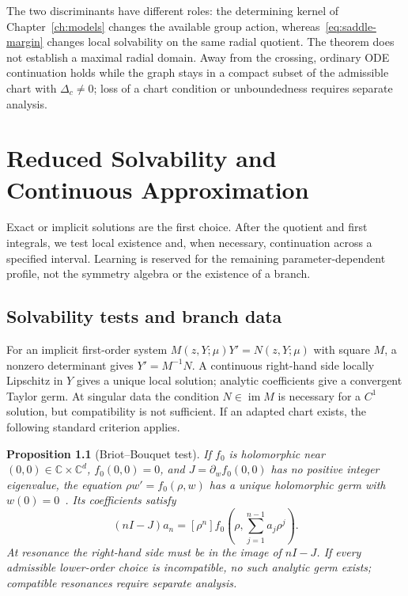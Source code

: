 \documentclass[12pt,a4paper,oneside]{report}
\numberwithin{equation}{chapter}
\newtheorem{proposition}[theorem]{Proposition}
\theoremstyle{definition}
\theoremstyle{remark}\newtheorem{remark}[theorem]{Remark}
\newif\ifreviewmarks
\DeclareRobustCommand{\review}[1]{{\ifreviewmarks\color{authorblue}\fi #1}}
\begin{document}
\review{The two discriminants have different roles: the determining kernel of Chapter~\ref{ch:models} changes the available group action, whereas~\eqref{eq:saddle-margin} changes local solvability on the same radial quotient. The theorem does not establish a maximal radial domain. Away from the crossing, ordinary ODE continuation holds while the graph stays in a compact subset of the admissible chart with $\Delta_c\ne0$; loss of a chart condition or unboundedness requires separate analysis.}
\FloatBarrier
\chapter{Reduced Solvability and Continuous Approximation}\label{ch:computation}
\review{Exact or implicit solutions are the first choice. After the quotient and first integrals, we test local existence and, when necessary, continuation across a specified interval. Learning is reserved for the remaining parameter-dependent profile, not the symmetry algebra or the existence of a branch.}

\section{Solvability tests and branch data}\label{sec:solver-criteria}
\review{For an implicit first-order system $M(z,Y;\mu)Y'=N(z,Y;\mu)$ with square $M$, a nonzero determinant gives $Y'=M^{-1}N$. A continuous right-hand side locally Lipschitz in $Y$ gives a unique local solution; analytic coefficients give a convergent Taylor germ. At singular data the condition $N\in\operatorname{im}M$ is necessary for a $C^1$ solution, but compatibility is not sufficient. If an adapted chart exists, the following standard criterion applies.}
\begin{proposition}[Briot--Bouquet test]\label{prop:bb}
If $f_0$ is holomorphic near $(0,0)\in\mathbb C\times\mathbb C^d$, $f_0(0,0)=0$, and $J=\partial_w f_0(0,0)$ has no positive integer eigenvalue, the equation $\rho w'=f_0(\rho,w)$ has a unique holomorphic germ with $w(0)=0$~\cite[Prop.~2.1]{rong2013}. Its coefficients satisfy
\[
 (nI-J)a_n=[\rho^n]f_0\left(\rho,\sum_{j=1}^{n-1}a_j\rho^j\right).
\]
\review{At resonance the right-hand side must be in the image of $nI-J$. If every admissible lower-order choice is incompatible, no such analytic germ exists; compatible resonances require separate analysis.}
\end{proposition}
\end{document}
